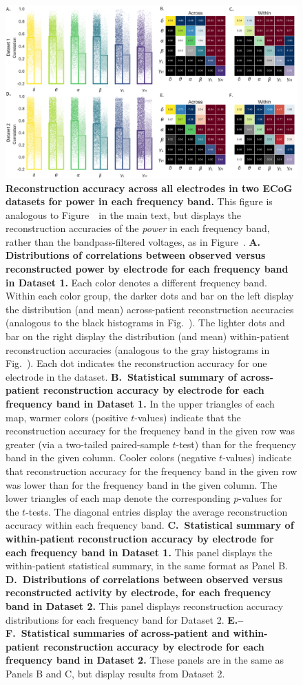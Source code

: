 \documentclass[10pt]{article}
\begin{document}
\begin{figure}[p]
\centering
\includegraphics[width=\textwidth]{figs/supplemental_4}
\caption{\textbf{Reconstruction accuracy across all electrodes in two ECoG
datasets for power in each frequency band.} This figure is analogous to
Figure~\freqs~in the main text, but displays the reconstruction accuracies of
the \textit{power} in each frequency band, rather than the bandpass-filtered
voltages, as in Figure~\freqs. \textbf{A. Distributions of correlations between
observed versus reconstructed power by electrode for each frequency band in
Dataset 1.}  Each color denotes a different frequency band. Within each color
group, the darker dots and bar on the left display the distribution (and mean)
across-patient reconstruction accuracies (analogous to the black histograms in
Fig.~\corrmaps).  The lighter dots and bar on the right display the distribution
(and mean) within-patient reconstruction accuracies (analogous to the gray
histograms in Fig.~\corrmaps). Each dot indicates the reconstruction accuracy
for one electrode in the dataset. \textbf{B.~Statistical summary of
across-patient reconstruction accuracy by electrode for each frequency band in
Dataset 1.} In the upper triangles of each map, warmer colors (positive
$t$-values) indicate that the reconstruction accuracy for the frequency band in
the given row was greater (via a two-tailed paired-sample $t$-test) than for the
frequency band in the given column. Cooler colors (negative $t$-values) indicate
that reconstruction accuracy for the frequency band in the given row was lower
than for the frequency band in the given column. The lower triangles of each map
denote the corresponding $p$-values for the $t$-tests. The diagonal entries
display the average reconstruction accuracy within each frequency band.
\textbf{C.~Statistical summary of within-patient reconstruction accuracy by
electrode for each frequency band in Dataset 1.} This panel displays the
within-patient statistical summary, in the same format as Panel B.
\textbf{D.~Distributions of correlations between observed versus reconstructed
activity by electrode, for each frequency band in Dataset 2.} This panel
displays reconstruction accuracy distributions for each frequency band for
Dataset 2. \textbf{E.--F.~Statistical summaries of across-patient and
within-patient reconstruction accuracy by electrode for each frequency band in
Dataset 2.} These panels are in the same as Panels B and C, but display results
from Dataset 2.}
\label{fig:supplemental_4}
\end{figure}
\end{document}
